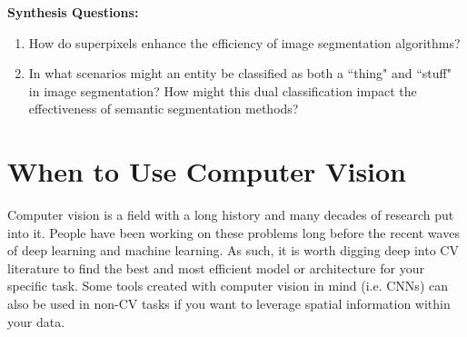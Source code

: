 \vspace{10bp}
\begin{questionbox}
    \textbf{Synthesis Questions:}
    \begin{enumerate}    
        \item How do superpixels enhance the efficiency of image segmentation algorithms?
        \item In what scenarios might an entity be classified as both a ``thing" and ``stuff" in image segmentation? How might this dual classification impact the effectiveness of semantic segmentation methods?
    \end{enumerate}
    \vspace{1bp}
\end{questionbox}

\section{When to Use Computer Vision}
\begin{flushleft}
    \large Computer vision is a field with a long history and many decades of research put into it. People have been working on these problems long before the recent waves of deep learning and machine learning. As such, it is worth digging deep into CV literature to find the best and most efficient model or architecture for your specific task. Some tools created with computer vision in mind (i.e. CNNs) can also be used in non-CV tasks if you want to leverage spatial information within your data.
\end{flushleft}


